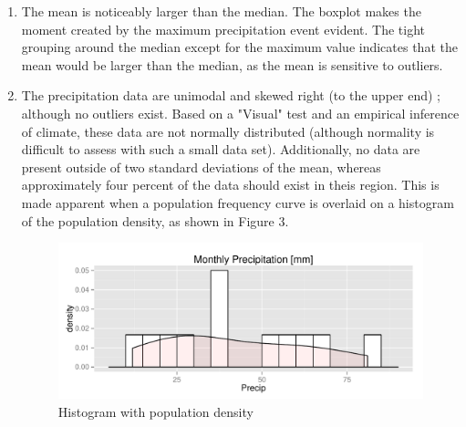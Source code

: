 \documentclass{article}\usepackage[]{graphicx}\usepackage[]{color}
\makeatletter
\def\maxwidth{ %
  \ifdim\Gin@nat@width>\linewidth
    \linewidth
  \else
    \Gin@nat@width
  \fi
}
\newenvironment{knitrout}{}{} %
\makeatother
\begin{document}
\begin{enumerate}
\begin{enumerate}
      \item The mean is noticeably larger than the median.  The boxplot makes the
      moment created by the maximum precipitation event evident.  The tight grouping
      around the median except for the maximum value indicates that
      the mean would be larger than the median, as the mean is sensitive to outliers.

      \item The precipitation data are unimodal and skewed right (to the upper end)
        ; although no outliers exist.  Based on a "Visual" test and an empirical
        inference of climate, these data are not normally distributed (although normality
        is difficult to assess with such a small data set).  Additionally, no data
        are present outside of two standard deviations of the mean, whereas
        approximately four percent of the data should exist in theis region.
        This is made apparent when a population frequency curve is overlaid
        on a histogram of the population density, as shown in Figure 3.



\begin{figure}[H] \begin{center}
\begin{knitrout}
\color{fgcolor}
\includegraphics[width=\maxwidth]{figure/1p_den} 

\end{knitrout}
\end{center} \vspace{-0.15in} \caption{Histogram with population density} \end{figure}


\end{enumerate}
\end{enumerate}
\end{document}
